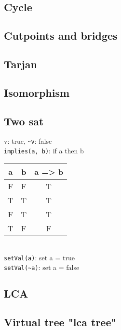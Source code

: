 
\subsection{Cycle }

\subsection{Cutpoints and bridges }

\subsection{Tarjan }

\subsection{Isomorphism }

\subsection{Two sat }

v: true, \lstinline{~v}: false \\

\lstinline{implies(a, b)}: if a then b \\
\begin{tabular}{ |c |c |c|  }
\hline 
a & b &  a => b \\
\hline 
F & F  &   T \\
T & T  &   T \\
F & T   &  T \\
T & F  &   F \\
\hline
\end{tabular} \\

\lstinline{setVal(a)}: set a = true \\
\lstinline{setVal(~a)}: set a = false \\

\subsection{LCA }

\subsection{Virtual tree  "lca tree"}

